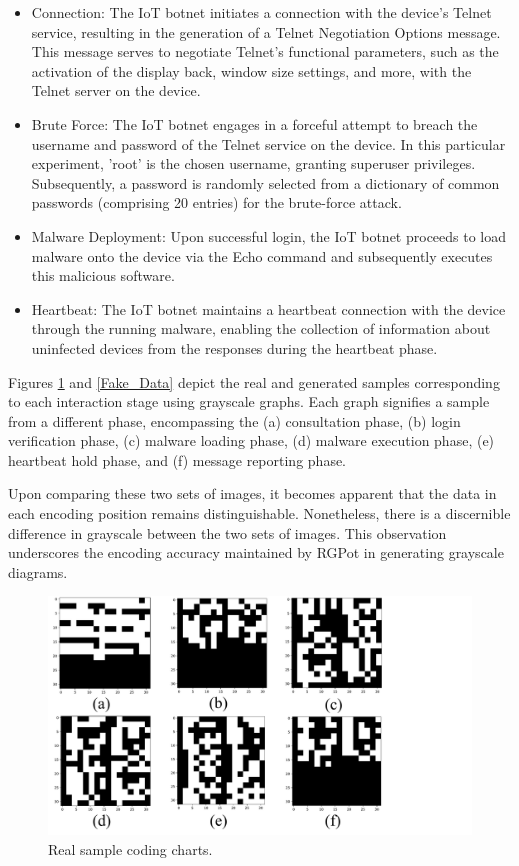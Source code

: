 \documentclass[journal]{IEEEtai}
\begin{document}
\begin{itemize}
    \item Connection: The IoT botnet initiates a connection with the device's Telnet service, resulting in the generation of a Telnet Negotiation Options message. 
    This message serves to negotiate Telnet's functional parameters, such as the activation of the display back, window size settings, and more, with the Telnet server on the device.

    \item Brute Force: The IoT botnet engages in a forceful attempt to breach the username and password of the Telnet service on the device. In this particular experiment, 'root' is the chosen username, granting superuser privileges. 
    Subsequently, a password is randomly selected from a dictionary of common passwords (comprising 20 entries) for the brute-force attack.

    \item Malware Deployment: Upon successful login, the IoT botnet proceeds to load malware onto the device via the Echo command and subsequently executes this malicious software.

    \item Heartbeat: The IoT botnet maintains a heartbeat connection with the device through the running malware, enabling the collection of information about uninfected devices from the responses during the heartbeat phase.

\end{itemize}

Figures \ref{Real_Data} and \ref{Fake_Data} depict the real and generated samples corresponding to each interaction stage using grayscale graphs. Each graph signifies a sample from a different phase, encompassing the (a) consultation phase, (b) login verification phase, (c) malware loading phase, (d) malware execution phase, (e) heartbeat hold phase, and (f) message reporting phase.

Upon comparing these two sets of images, it becomes apparent that the data in each encoding position remains distinguishable. 
Nonetheless, there is a discernible difference in grayscale between the two sets of images. 
This observation underscores the encoding accuracy maintained by RGPot in generating grayscale diagrams.




\begin{figure}[!h]
	\centering
	\includegraphics[width = 0.7\linewidth]{Figures/Real_Data.pdf}
	\caption{Real sample coding charts.}
	\label{Real_Data}
\end{figure}
\end{document}
